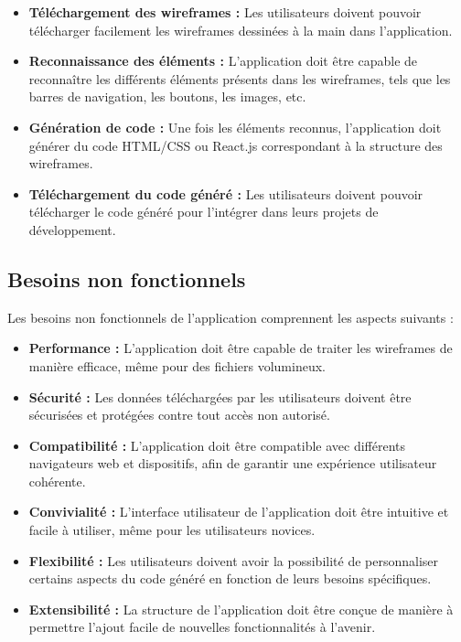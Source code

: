 \begin{itemize}
    \item \textbf{Téléchargement des wireframes :} Les utilisateurs doivent pouvoir télécharger facilement les wireframes dessinées à la main dans l'application.
    \item \textbf{Reconnaissance des éléments :} L'application doit être capable de reconnaître les différents éléments présents dans les wireframes, tels que les barres de navigation, les boutons, les images, etc.
    \item \textbf{Génération de code :} Une fois les éléments reconnus, l'application doit générer du code HTML/CSS ou React.js correspondant à la structure des wireframes.
    \item \textbf{Téléchargement du code généré :} Les utilisateurs doivent pouvoir télécharger le code généré pour l'intégrer dans leurs projets de développement.
\end{itemize}

\subsection{Besoins non fonctionnels}

Les besoins non fonctionnels de l'application comprennent les aspects suivants :

\begin{itemize}
    \item \textbf{Performance :} L'application doit être capable de traiter les wireframes de manière efficace, même pour des fichiers volumineux.
    \item \textbf{Sécurité :} Les données téléchargées par les utilisateurs doivent être sécurisées et protégées contre tout accès non autorisé.
    \item \textbf{Compatibilité :} L'application doit être compatible avec différents navigateurs web et dispositifs, afin de garantir une expérience utilisateur cohérente.
    \item \textbf{Convivialité :} L'interface utilisateur de l'application doit être intuitive et facile à utiliser, même pour les utilisateurs novices.
    \item \textbf{Flexibilité :} Les utilisateurs doivent avoir la possibilité de personnaliser certains aspects du code généré en fonction de leurs besoins spécifiques.
    \item \textbf{Extensibilité :} La structure de l'application doit être conçue de manière à permettre l'ajout facile de nouvelles fonctionnalités à l'avenir.
\end{itemize}


